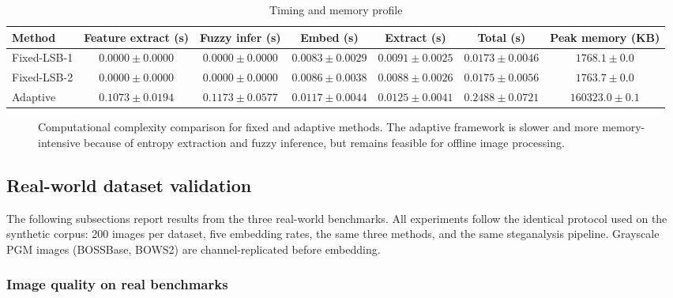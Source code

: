 \begin{table}[H]
\centering
\caption{Timing and memory profile}
\label{tab:complexity}
\begin{adjustbox}{max width=\textwidth}
\begin{tabular}{lcccccc}
\toprule
Method & Feature extract (s) & Fuzzy infer (s) & Embed (s) & Extract (s) & Total (s) & Peak memory (KB) \\
\midrule
Fixed-LSB-1 & \(0.0000 \pm 0.0000\) & \(0.0000 \pm 0.0000\) & \(0.0083 \pm 0.0029\) & \(0.0091 \pm 0.0025\) & \(0.0173 \pm 0.0046\) & \(1768.1 \pm 0.0\) \\
Fixed-LSB-2 & \(0.0000 \pm 0.0000\) & \(0.0000 \pm 0.0000\) & \(0.0086 \pm 0.0038\) & \(0.0088 \pm 0.0026\) & \(0.0175 \pm 0.0056\) & \(1763.7 \pm 0.0\) \\
Adaptive & \(0.1073 \pm 0.0194\) & \(0.1173 \pm 0.0577\) & \(0.0117 \pm 0.0044\) & \(0.0125 \pm 0.0041\) & \(0.2488 \pm 0.0721\) & \(160323.0 \pm 0.1\) \\
\bottomrule
\end{tabular}
\end{adjustbox}
\end{table}

\begin{figure}[H]
    \centering
    \caption{Computational complexity comparison for fixed and adaptive methods. The adaptive framework is slower and more memory-intensive because of entropy extraction and fuzzy inference, but remains feasible for offline image processing.}
    \label{fig:complexity_plot}
\end{figure}

\subsection{Real-world dataset validation}
\label{sec:real_results}

The following subsections report results from the three real-world benchmarks. All experiments follow the identical protocol used on the synthetic corpus: 200 images per dataset, five embedding rates, the same three methods, and the same steganalysis pipeline. Grayscale PGM images (BOSSBase, BOWS2) are channel-replicated before embedding.

\subsubsection{Image quality on real benchmarks}

